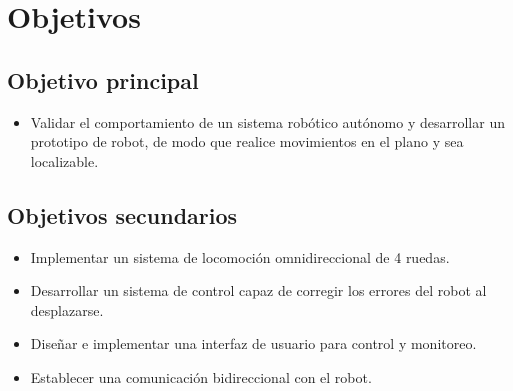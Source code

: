 \chapter{Objetivos}

\section{Objetivo principal}

\begin{itemize}
    \item Validar el comportamiento de un sistema robótico autónomo y desarrollar un prototipo de robot, de modo que realice movimientos en el plano y sea localizable.
\end{itemize}


\section{Objetivos secundarios}

\begin{itemize}
    \item Implementar un sistema de locomoción omnidireccional de 4 ruedas.
    \item Desarrollar un sistema de control capaz de corregir los errores del robot al desplazarse.
    \item Diseñar e implementar una interfaz de usuario para control y monitoreo.
    \item Establecer una comunicación bidireccional con el robot.
\end{itemize}